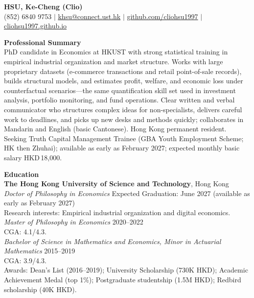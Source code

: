 \documentclass[11pt,letterpaper]{article}
\begin{document}
{\Large \textbf{HSU, Ke-Cheng (Clio)}}\\[1pt]
(852) 6840 9753 \quad $|$ \quad \href{mailto:khsu@connect.ust.hk}{khsu@connect.ust.hk} \quad $|$ \quad \href{https://github.com/cliohsu1997}{github.com/cliohsu1997} \quad $|$ \quad \href{https://cliohsu1997.github.io/}{cliohsu1997.github.io}

\vspace{0.15pt}

{\large \textbf{Professional Summary}}\\[-0.5pt]
PhD candidate in Economics at HKUST with strong statistical training in empirical industrial organization and market structure. Works with large proprietary datasets (e-commerce transactions and retail point-of-sale records), builds structural models, and estimates profit, welfare, and economic loss under counterfactual scenarios---the same quantification skill set used in investment analysis, portfolio monitoring, and fund operations. Clear written and verbal communicator who structures complex ideas for non-specialists, delivers careful work to deadlines, and picks up new desks and methods quickly; collaborates in Mandarin and English (basic Cantonese). Hong Kong permanent resident. Seeking Truth Capital Management Trainee (GBA Youth Employment Scheme; HK then Zhuhai); available as early as February 2027; expected monthly basic salary HKD\,18,000.

\vspace{0.15pt}

{\large \textbf{Education}}\\[-0.5pt]
\textbf{The Hong Kong University of Science and Technology}, Hong Kong\\
\textit{Doctor of Philosophy in Economics} \hfill Expected Graduation: June 2027 (available as early as February 2027)\\
Research interests: Empirical industrial organization and digital economics.\\
\textit{Master of Philosophy in Economics} \hfill 2020--2022\\
CGA: 4.1/4.3.\\
\textit{Bachelor of Science in Mathematics and Economics, Minor in Actuarial Mathematics} \hfill 2015--2019\\
CGA: 3.9/4.3.\\
Awards: Dean's List (2016--2019); University Scholarship (730K HKD); Academic Achievement Medal (top 1\%); Postgraduate studentship (1.5M HKD); Redbird scholarship (40K HKD).
\end{document}
